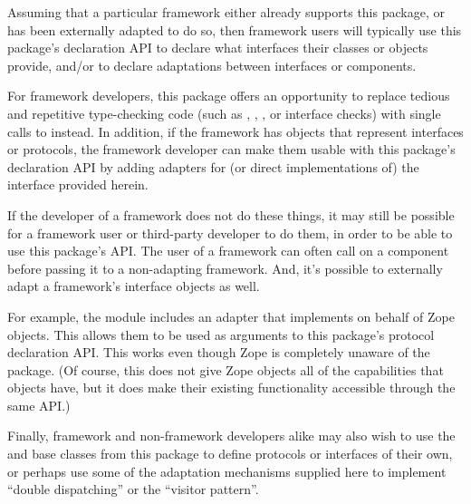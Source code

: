 Assuming that a particular framework either already supports this package, or
has been externally adapted to do so, then framework users will typically
use this package's declaration API to declare what interfaces their classes or
objects provide, and/or to declare adaptations between interfaces or
components.

For framework developers, this package offers an opportunity to replace
tedious and repetitive type-checking code (such as ,
, , or interface checks) with single
calls to  instead.  In addition, if the framework has
objects that represent interfaces or protocols, the framework developer can
make them usable with this package's declaration API by adding adapters for
(or direct implementations of) the  interface provided
herein.

If the developer of a framework does not do these things, it may still be
possible for a framework user or third-party developer to do them, in order to
be able to use this package's API.  The user of a framework can often call
 on a component before passing it to a non-adapting
framework.  And, it's possible to externally adapt a
framework's interface objects as well.

For example, the  module includes an adapter that
implements  on behalf of Zope 
objects.  This allows them to be used as arguments to this package's protocol
declaration API.  This works even though Zope is completely unaware of the
 package.  (Of course, this does not give Zope
 objects all of the capabilities that 
objects have, but it does make their existing functionality accessible
through the same API.)

Finally, framework and non-framework developers alike may also wish to use the
 and  base classes from this package to
define protocols or interfaces of their own, or perhaps use some of the
adaptation mechanisms supplied here to implement ``double dispatching'' or
the ``visitor pattern''.


\begin{seealso}


\end{seealso}



































